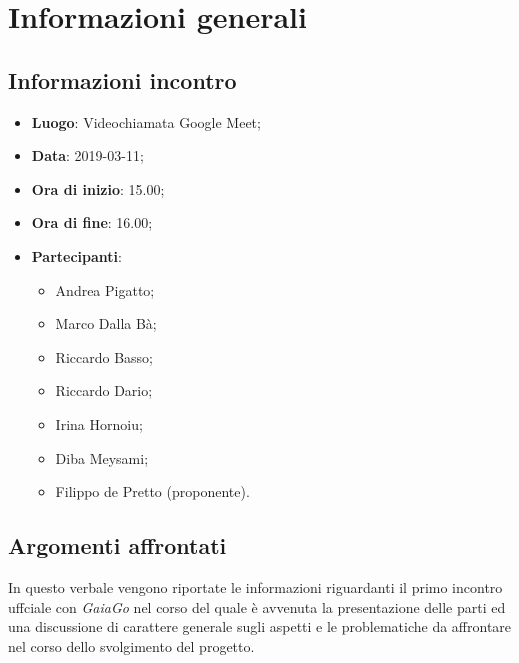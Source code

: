 \section{Informazioni generali}

\subsection{Informazioni incontro}
\begin{itemize}
\item \textbf{Luogo}: Videochiamata Google Meet;
\item \textbf{Data}: 2019-03-11;
\item \textbf{Ora di inizio}: 15.00;
\item \textbf{Ora di fine}: 16.00;
\item \textbf{Partecipanti}: 
\begin{itemize}
	\item Andrea Pigatto;
	\item Marco Dalla Bà;
	\item Riccardo Basso;
	\item Riccardo Dario;
	\item Irina Hornoiu;
	\item Diba Meysami;
	\item Filippo de Pretto (proponente).
\end{itemize}
\end{itemize}

\subsection{Argomenti affrontati}
In questo verbale vengono riportate le informazioni riguardanti il primo incontro uffciale con \textit{GaiaGo} nel corso del quale è avvenuta la presentazione delle parti ed una discussione di carattere generale sugli aspetti e le problematiche da affrontare nel corso dello svolgimento del progetto.

